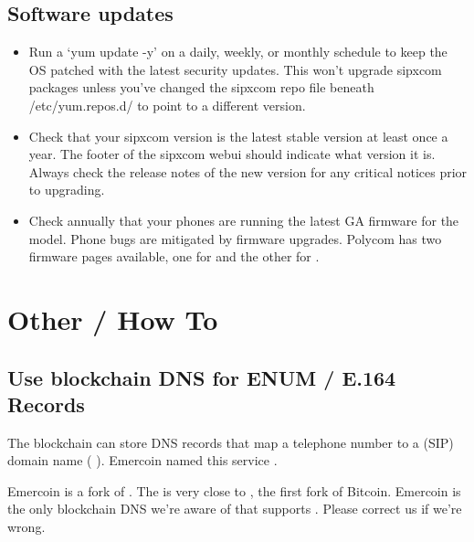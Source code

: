 \documentclass[letterpaper,10pt,english]{sphinxmanual}
\begin{document}
\section{Software updates}
\label{\detokenize{maintenance:software-updates}}\begin{itemize}
\item {} 
Run a ‘yum update -y’ on a daily, weekly, or monthly schedule to keep the OS patched with the latest security updates.
This won’t upgrade sipxcom packages unless you’ve changed the sipxcom repo file beneath /etc/yum.repos.d/ to point to a different version.

\item {} 
Check that your sipxcom version is the latest stable version at least once a year. The footer of the sipxcom webui should indicate what version it is.
Always check the release notes of the new version for any critical notices prior to upgrading.

\item {} 
Check annually that your phones are running the latest GA firmware for the model. Phone bugs are mitigated by firmware upgrades.
Polycom has two firmware pages available, one for 
and the other for .

\end{itemize}


\chapter{Other / How To}
\label{\detokenize{howto:other-how-to}}\label{\detokenize{howto::doc}}

\section{Use blockchain DNS for ENUM / E.164 Records}
\label{\detokenize{howto:use-blockchain-dns-for-enum-e-164-records}}
The  blockchain can store DNS records that map a telephone number to a (SIP) domain name (  ).
Emercoin named this service .

Emercoin is a fork of .
The  is very close to , the first fork of Bitcoin.
Emercoin is the only blockchain DNS we’re aware of that supports . Please correct us if we’re wrong.
\end{document}

